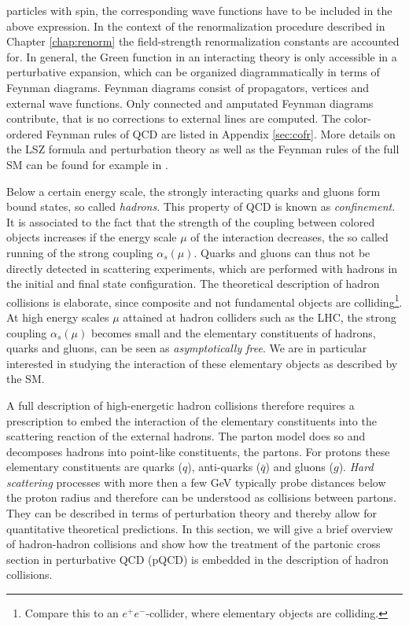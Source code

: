 particles with spin, the corresponding wave functions have to be
included in the above expression. In the context of the renormalization procedure described in
Chapter \ref{chap:renorm} the field-strength renormalization constants are accounted for.
In general, the Green function in an interacting theory is only accessible in a perturbative expansion,
which can be organized diagrammatically in terms of Feynman diagrams. Feynman diagrams consist
of propagators, vertices and external wave functions. Only
connected and amputated Feynman diagrams contribute, that is no corrections to external lines are
computed. The color-ordered Feynman rules
of QCD are listed in Appendix \ref{sec:cofr}. More details on the LSZ
formula and perturbation theory as well as the Feynman rules of the
full SM can
be found for example in \cite{Bohm:2001yx,Schwartz:2013pla}. 


Below a certain energy scale, the strongly interacting quarks and gluons form bound states, so called \textit{hadrons}. This property of
QCD is known as \textit{confinement}. It is associated to the fact
that the strength of the coupling
between colored objects increases if the energy scale $\mu$ of the interaction decreases, the so called running of the
strong coupling $\alpha_s(\mu)$. Quarks and gluons can thus not be directly detected in scattering
experiments, which are performed with hadrons in the initial and final
state configuration. The theoretical description of hadron collisions is elaborate, since
composite and not fundamental objects are colliding\footnote{Compare this to an $e^+e^-$-collider, where
  elementary objects are colliding.}. At high energy scales $\mu$
attained at hadron colliders such as the LHC, the strong
coupling $\alpha_s(\mu)$ becomes small and the elementary constituents
of hadrons, quarks and gluons, can be seen as \textit{asymptotically
  free}. We are in particular interested in studying the interaction
of these elementary objects as described by the SM.


A full description of high-energetic hadron collisions therefore requires a prescription to embed the interaction
of the elementary constituents into the scattering reaction
of the external hadrons. The parton model \cite{Feynman1969} does so
and decomposes hadrons into point-like constituents, the partons. For
protons these elementary constituents are quarks ($q$), anti-quarks
($\bar{q}$) and gluons ($g$). \textit{Hard
scattering} processes with more then a few GeV typically
probe distances below the proton radius and therefore can be understood as
collisions between partons. They can be described in terms of
perturbation theory and thereby allow for quantitative theoretical predictions. In this section, we will give a brief overview of hadron-hadron collisions and
show how the treatment of the partonic cross section in perturbative QCD
(pQCD) is embedded in the description of hadron collisions.

